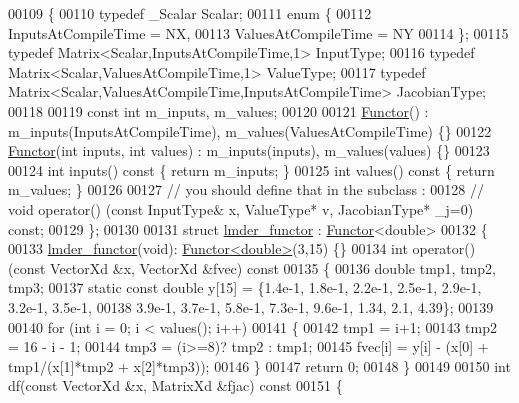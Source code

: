 \begin{DoxyCode}
00109 \{
00110   \textcolor{keyword}{typedef} \_Scalar Scalar;
00111   \textcolor{keyword}{enum} \{
00112     InputsAtCompileTime = NX,
00113     ValuesAtCompileTime = NY
00114   \};
00115   \textcolor{keyword}{typedef} Matrix<Scalar,InputsAtCompileTime,1> InputType;
00116   \textcolor{keyword}{typedef} Matrix<Scalar,ValuesAtCompileTime,1> ValueType;
00117   \textcolor{keyword}{typedef} Matrix<Scalar,ValuesAtCompileTime,InputsAtCompileTime> JacobianType;
00118 
00119   \textcolor{keyword}{const} \textcolor{keywordtype}{int} m\_inputs, m\_values;
00120 
00121   \hyperlink{struct_functor}{Functor}() : m\_inputs(InputsAtCompileTime), m\_values(ValuesAtCompileTime) \{\}
00122   \hyperlink{struct_functor}{Functor}(\textcolor{keywordtype}{int} inputs, \textcolor{keywordtype}{int} values) : m\_inputs(inputs), m\_values(values) \{\}
00123 
00124   \textcolor{keywordtype}{int} inputs()\textcolor{keyword}{ const }\{ \textcolor{keywordflow}{return} m\_inputs; \}
00125   \textcolor{keywordtype}{int} values()\textcolor{keyword}{ const }\{ \textcolor{keywordflow}{return} m\_values; \}
00126 
00127   \textcolor{comment}{// you should define that in the subclass :}
00128 \textcolor{comment}{//  void operator() (const InputType& x, ValueType* v, JacobianType* \_j=0) const;}
00129 \};
00130 
00131 \textcolor{keyword}{struct }\hyperlink{structlmder__functor}{lmder\_functor} : \hyperlink{struct_functor}{Functor}<double>
00132 \{
00133     \hyperlink{structlmder__functor}{lmder\_functor}(\textcolor{keywordtype}{void}): \hyperlink{struct_functor}{Functor<double>}(3,15) \{\}
00134     \textcolor{keywordtype}{int} operator()(\textcolor{keyword}{const} VectorXd &x, VectorXd &fvec)\textcolor{keyword}{ const}
00135 \textcolor{keyword}{    }\{
00136         \textcolor{keywordtype}{double} tmp1, tmp2, tmp3;
00137         \textcolor{keyword}{static} \textcolor{keyword}{const} \textcolor{keywordtype}{double} y[15] = \{1.4e-1, 1.8e-1, 2.2e-1, 2.5e-1, 2.9e-1, 3.2e-1, 3.5e-1,
00138             3.9e-1, 3.7e-1, 5.8e-1, 7.3e-1, 9.6e-1, 1.34, 2.1, 4.39\};
00139 
00140         \textcolor{keywordflow}{for} (\textcolor{keywordtype}{int} i = 0; i < values(); i++)
00141         \{
00142             tmp1 = i+1;
00143             tmp2 = 16 - i - 1;
00144             tmp3 = (i>=8)? tmp2 : tmp1;
00145             fvec[i] = y[i] - (x[0] + tmp1/(x[1]*tmp2 + x[2]*tmp3));
00146         \}
00147         \textcolor{keywordflow}{return} 0;
00148     \}
00149 
00150     \textcolor{keywordtype}{int} df(\textcolor{keyword}{const} VectorXd &x, MatrixXd &fjac)\textcolor{keyword}{ const}
00151 \textcolor{keyword}{    }\{

\end{DoxyCode}
